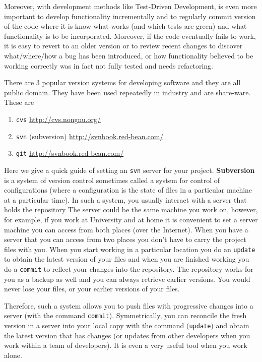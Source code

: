 \documentclass[article,12pt]{article}
\begin{document}
Moreover, with development methods like Test-Driven Development, is even
more important to develop functionality incrementally and to regularly
commit version of the code where it is know what works (and which tests are green)
and what functionality is to be incorporated. 
Moreover, if the code eventually fails to work, it is easy to revert to an older
version or to review recent changes to discover what/where/how a bug has been
introduced, or how functionality believed to be working correctly was in fact
not fully tested and needs refactoring.

There are 3 popular version systems for developing software and they are
all public domain. They have been used repeatedly in industry and are
share-ware. These are
\begin{enumerate}
\item {\tt cvs}  \url {http://cvs.nongnu.org/}
\item {\tt svn} (subversion) \url{ http://svnbook.red-bean.com/}
\item {\tt git}  \url { http://svnbook.red-bean.com/}
\end{enumerate}

Here we give a quick guide of setting an {\tt svn} server for your project.
{\bf Subversion}
is a system of version control sometimes called a system for control
of configurations (where a configuration is the state of files
in a particular machine at a particular time).
In such a system, you usually interact with a server that holds the repository
The server could be the same machine you work on, however, for example,
if you work at University and at home it is convenient to set a server machine you can access
from both places (over the Internet).
When you have a server that you can access from two places you don't have
to carry the project files with you. When you start working in a
particular location you do an {\tt update} to obtain the latest version
of your files and when you are finished working you do a {\tt commit} to
reflect your changes into the repository.
The repository works for you as a backup as well and you can always retrieve
earlier versions. You  would never lose your files, or your earlier versions
of your files.

Therefore, such a system allows you to push files with progressive changes
 into a server
 (with the command {\tt commit}).
Symmetrically, you can reconcile the fresh version in a server into your local
copy with the command  ({\tt update}) and obtain the latest version that has
changes (or updates from other developers when you work within
a team of developers).
It is even a very useful tool when you work alone.
\end{document}

